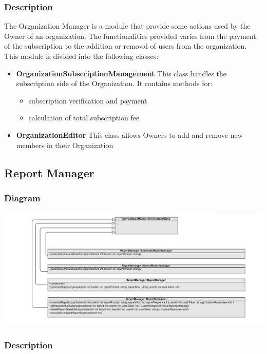 \documentclass{article}
\begin{document}
\subsubsection{Description}
The Organization Manager is a module that provide some actions used by the Owner of an organization.
The functionalities provided varies from the payment of the subscription to the addition or removal of users from the organization.
This module is divided into the following classes:
\begin{itemize}
    \item \textbf{OrganizationSubscriptionManagement}
    This class handles the subscription side of the Organization. It contains methods for:
    \begin{itemize}
        \item subscription verification and payment
        \item calculation of total subscription fee
    \end{itemize}
    \item \textbf{OrganizationEditor}
    This class allows Owners to add and remove new members in their Organization
\end{itemize}%
\subsection{Report Manager} %

\subsubsection{Diagram}

\includegraphics[width=\textwidth,height=\textheight,keepaspectratio]{images/class_diagram/reportManager.jpg}

\subsubsection{Description}
\end{document}
